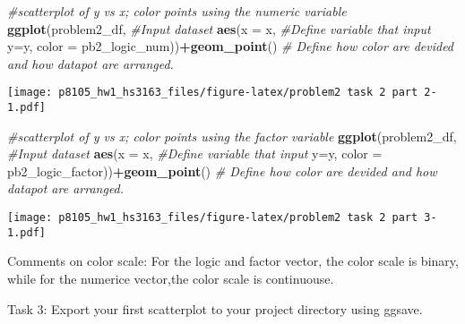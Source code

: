 \documentclass[]{article}
\newenvironment{Shaded}{\begin{snugshade}}{\end{snugshade}}
\newcommand{\CommentTok}[1]{\textcolor[rgb]{0.56,0.35,0.01}{\textit{#1}}}
\newcommand{\DataTypeTok}[1]{\textcolor[rgb]{0.13,0.29,0.53}{#1}}
\newcommand{\KeywordTok}[1]{\textcolor[rgb]{0.13,0.29,0.53}{\textbf{#1}}}
\newcommand{\NormalTok}[1]{#1}
\newcommand{\OperatorTok}[1]{\textcolor[rgb]{0.81,0.36,0.00}{\textbf{#1}}}
\begin{document}
\begin{Shaded}
\begin{Highlighting}[]
\CommentTok{#scatterplot of y vs x; color points using the numeric variable}
\KeywordTok{ggplot}\NormalTok{(problem2_df, }\CommentTok{#Input dataset}
       \KeywordTok{aes}\NormalTok{(}\DataTypeTok{x =}\NormalTok{ x, }\CommentTok{#Define variable that input}
           \DataTypeTok{y=}\NormalTok{y,}
           \DataTypeTok{color =}\NormalTok{ pb2_logic_num))}\OperatorTok{+}\KeywordTok{geom_point}\NormalTok{() }\CommentTok{# Define how color are devided and how datapot are arranged.}
\end{Highlighting}
\end{Shaded}

\texttt{[image: p8105\_hw1\_hs3163\_files/figure-latex/problem2 task 2 part 2-1.pdf]}

\begin{Shaded}
\begin{Highlighting}[]
\CommentTok{#scatterplot of y vs x; color points using the factor variable}
\KeywordTok{ggplot}\NormalTok{(problem2_df, }\CommentTok{#Input dataset}
       \KeywordTok{aes}\NormalTok{(}\DataTypeTok{x =}\NormalTok{ x, }\CommentTok{#Define variable that input}
           \DataTypeTok{y=}\NormalTok{y,}
           \DataTypeTok{color =}\NormalTok{ pb2_logic_factor))}\OperatorTok{+}\KeywordTok{geom_point}\NormalTok{() }\CommentTok{# Define how color are devided and how datapot are arranged.}
\end{Highlighting}
\end{Shaded}

\texttt{[image: p8105\_hw1\_hs3163\_files/figure-latex/problem2 task 2 part 3-1.pdf]}

Comments on color scale: For the logic and factor vector, the color
scale is binary, while for the numerice vector,the color scale is
continuouse.

Task 3: Export your first scatterplot to your project directory using
ggsave.
\end{document}
